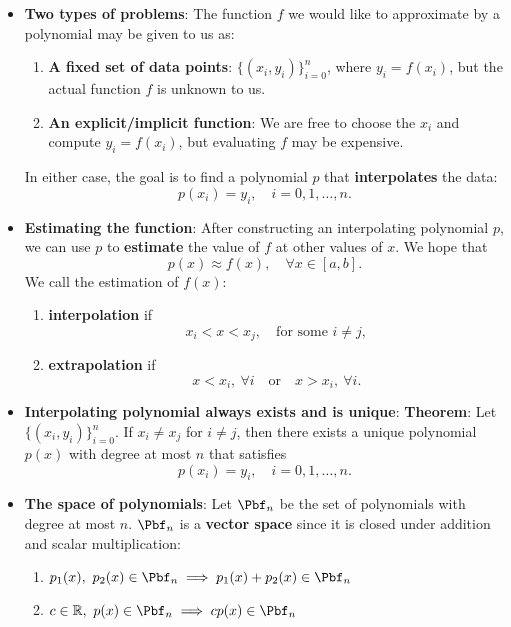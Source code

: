 \documentclass{report}
\begin{document}
\begin{itemize}
        \item \textbf{Two types of problems}:
            The function $f$ we would like to approximate by a polynomial may be given to us as:
            \begin{enumerate}
                \item \textbf{A fixed set of data points}: $\big\{(x_i, y_i)\big\}_{i=0}^n$, where $y_i = f(x_i)$, but the actual function $f$ is unknown to us.
                \item \textbf{An explicit/implicit function}: We are free to choose the $x_i$ and compute $y_i = f(x_i)$, but evaluating $f$ may be expensive.
            \end{enumerate}
            In either case, the goal is to find a polynomial $p$ that \textbf{interpolates} the data:
            $$p(x_i) = y_i, \quad i = 0,1,\ldots,n.$$
        \item \textbf{Estimating the function}:
            After constructing an interpolating polynomial $p$, we can use $p$ to \textbf{estimate} the value of $f$ at other values of $x$. We hope that
            $$ p(x) \approx f(x), \quad \forall x \in [a,b].$$
        We call the estimation of $f(x)$:
        \begin{enumerate}
            \item \textbf{interpolation} if 
                $$x_i < x < x_j, \quad \text{for some } i \neq j,$$
            \item \textbf{extrapolation} if 
                $$ x < x_i,\ \forall i \quad \text{or} \quad x > x_i,\ \forall i.$$
        \end{enumerate}
    \item \textbf{Interpolating polynomial always exists and is unique}:
        \bigbreak \noindent 
        \textbf{Theorem}:
        Let $\big\{(x_i,y_i)\big\}_{i=0}^n$. If $x_i \neq x_j$ for $i \neq j$, then there exists a unique polynomial $p(x)$ with degree at most $n$ that satisfies
        $$p(x_i) = y_i, \quad i = 0,1,\ldots,n.$$
    \item \textbf{The space of polynomials}:
        Let $\Pbf_n$ be the set of polynomials with degree at most $n$. 
        \bigbreak \noindent 
        $\Pbf_n$ is a \textbf{vector space} since it is closed under addition and scalar multiplication:
        \begin{enumerate}
            \item $p_1(x),\ p_2(x) \in \Pbf_n \implies p_1(x)+p_2(x) \in \Pbf_n$
            \item $c \in \mathbb{R},\ p(x) \in \Pbf_n \implies cp(x) \in \Pbf_n$

\end{enumerate}
\end{itemize}
\end{document}
